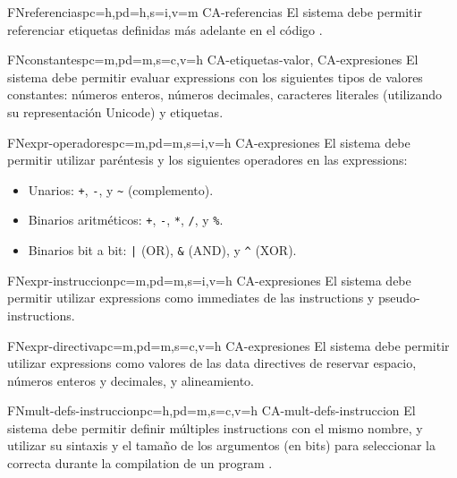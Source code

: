 \begin{softwareReq}{FN}{referencias}{pc=h,pd=h,s=i,v=m}
    {CA-referencias}
    El sistema debe permitir referenciar etiquetas definidas más adelante en el
    código .
\end{softwareReq}

\begin{softwareReq}{FN}{constantes}{pc=m,pd=m,s=c,v=h}
    {CA-etiquetas-valor, CA-expresiones}
    El sistema debe permitir evaluar \glspl{expression} con los siguientes tipos
    de valores constantes: números enteros, números decimales, caracteres
    literales (utilizando su representación Unicode) y etiquetas.
\end{softwareReq}

\begin{softwareReq}{FN}{expr-operadores}{pc=m,pd=m,s=i,v=h}
    {CA-expresiones}
    El sistema debe permitir utilizar paréntesis y los siguientes operadores en
    las \glspl{expression}:
    \begin{itemize}
        \item Unarios: \verb!+!, \verb!-!, y \verb!~! (complemento).
        \item Binarios aritméticos: \verb!+!, \verb!-!, \verb!*!, \verb!/!, y \verb!%!.
        \item Binarios bit a bit: \verb!|! (OR), \verb!&! (AND), y \verb!^! (XOR).
    \end{itemize}
\end{softwareReq}

\begin{softwareReq}{FN}{expr-instruccion}{pc=m,pd=m,s=i,v=h}
    {CA-expresiones}
    El sistema debe permitir utilizar \glspl{expression} como \glspl{immediate}
    de las \glspl{instruction} y \glspl{pseudo-instruction}.
\end{softwareReq}

\begin{softwareReq}{FN}{expr-directiva}{pc=m,pd=m,s=c,v=h}
    {CA-expresiones}
    El sistema debe permitir utilizar \glspl{expression} como valores de las
    \glspl{data directive} de reservar espacio, números enteros y decimales, y
    alineamiento.
\end{softwareReq}

\begin{softwareReq}{FN}{mult-defs-instruccion}{pc=h,pd=m,s=c,v=h}
    {CA-mult-defs-instruccion}
    El sistema debe permitir definir múltiples \glspl{instruction} con el mismo
    nombre, y utilizar su sintaxis y el tamaño de los argumentos (en bits) para
    seleccionar la correcta durante la \gls{compilation} de un \gls{program}
    .
\end{softwareReq}

